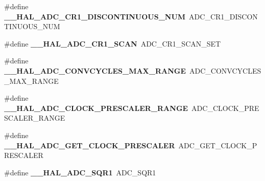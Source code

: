 \begin{DoxyCompactItemize}
\mbox{\label{group___h_a_l___a_d_c___aliased___macros_gab00342d0ece8deb8900df22b5193377e}} 
\#define {\bfseries \+\_\+\+\_\+\+H\+A\+L\+\_\+\+A\+D\+C\+\_\+\+C\+R1\+\_\+\+D\+I\+S\+C\+O\+N\+T\+I\+N\+U\+O\+U\+S\+\_\+\+N\+UM}~A\+D\+C\+\_\+\+C\+R1\+\_\+\+D\+I\+S\+C\+O\+N\+T\+I\+N\+U\+O\+U\+S\+\_\+\+N\+UM
\item 
\mbox{\label{group___h_a_l___a_d_c___aliased___macros_gae645d58040b162666fa506aeb3728f49}} 
\#define {\bfseries \+\_\+\+\_\+\+H\+A\+L\+\_\+\+A\+D\+C\+\_\+\+C\+R1\+\_\+\+S\+C\+AN}~A\+D\+C\+\_\+\+C\+R1\+\_\+\+S\+C\+A\+N\+\_\+\+S\+ET
\item 
\mbox{\label{group___h_a_l___a_d_c___aliased___macros_gaffcdf78845300c37812650611d2915b4}} 
\#define {\bfseries \+\_\+\+\_\+\+H\+A\+L\+\_\+\+A\+D\+C\+\_\+\+C\+O\+N\+V\+C\+Y\+C\+L\+E\+S\+\_\+\+M\+A\+X\+\_\+\+R\+A\+N\+GE}~A\+D\+C\+\_\+\+C\+O\+N\+V\+C\+Y\+C\+L\+E\+S\+\_\+\+M\+A\+X\+\_\+\+R\+A\+N\+GE
\item 
\mbox{\label{group___h_a_l___a_d_c___aliased___macros_gad371b9c9ce847537972a0bc6c1422c45}} 
\#define {\bfseries \+\_\+\+\_\+\+H\+A\+L\+\_\+\+A\+D\+C\+\_\+\+C\+L\+O\+C\+K\+\_\+\+P\+R\+E\+S\+C\+A\+L\+E\+R\+\_\+\+R\+A\+N\+GE}~A\+D\+C\+\_\+\+C\+L\+O\+C\+K\+\_\+\+P\+R\+E\+S\+C\+A\+L\+E\+R\+\_\+\+R\+A\+N\+GE
\item 
\mbox{\label{group___h_a_l___a_d_c___aliased___macros_ga0595fba00a50ea5ba7b8baf4cbdd6820}} 
\#define {\bfseries \+\_\+\+\_\+\+H\+A\+L\+\_\+\+A\+D\+C\+\_\+\+G\+E\+T\+\_\+\+C\+L\+O\+C\+K\+\_\+\+P\+R\+E\+S\+C\+A\+L\+ER}~A\+D\+C\+\_\+\+G\+E\+T\+\_\+\+C\+L\+O\+C\+K\+\_\+\+P\+R\+E\+S\+C\+A\+L\+ER
\item 
\mbox{\label{group___h_a_l___a_d_c___aliased___macros_ga7355b4d9c49af127fdb5a1dd7e8b66f0}} 
\#define {\bfseries \+\_\+\+\_\+\+H\+A\+L\+\_\+\+A\+D\+C\+\_\+\+S\+Q\+R1}~A\+D\+C\+\_\+\+S\+Q\+R1
\item 
\mbox{\label{group___h_a_l___a_d_c___aliased___macros_gad8e081521ef7ee963c7833376f52dbfd}} 

\end{DoxyCompactItemize}
